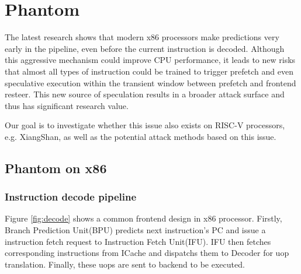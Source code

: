 \section{Phantom}
The latest research \cite{phantom}\cite{bunnyhop} shows that modern x86 processors make predictions very early in the pipeline, even before the current instruction is decoded. Although this aggressive mechanism could improve CPU performance, it leads to new risks that almost all types of instruction could be trained to trigger prefetch \cite{bunnyhop} and even speculative execution\cite{phantom} within the transient window between prefetch and frontend resteer. This new source of speculation results in a broader attack surface and thus has significant research value.

 Our goal is to investigate whether this issue also exists on RISC-V processors, e.g. XiangShan, as well as the potential attack methods based on this issue. 
 

\subsection{Phantom on x86}
\subsubsection{Instruction decode pipeline}

Figure \ref{fig:decode} shows a common frontend design in x86 processor. Firstly, Branch Prediction Unit(BPU) predicts next instruction's PC and issue a instruction fetch request to Instruction Fetch Unit(IFU). IFU then fetches corresponding instructions from ICache and dispatchs them to Decoder for uop translation. Finally, these uops are sent to backend to be executed.  

